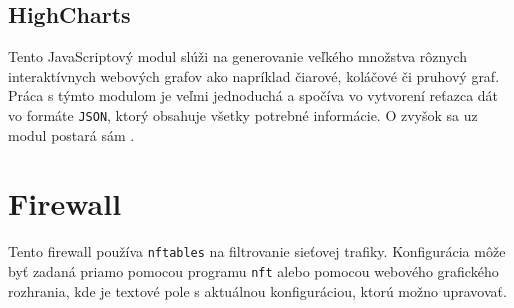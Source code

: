 		\subsection{HighCharts}
		\label{highcharts}
			Tento JavaScriptový modul slúži na generovanie veľkého množstva rôznych interaktívnych webových
			grafov ako napríklad čiarové, koláčové či pruhový graf. Práca s týmto modulom je veľmi jednoduchá
			a spočíva vo vytvorení reťazca dát vo formáte \texttt{JSON}, ktorý obsahuje všetky potrebné 
			informácie. O zvyšok sa uz modul postará sám \cite{highcharts}.
		        
	\section{Firewall}
		Tento firewall používa \texttt{nftables} na filtrovanie sieťovej trafiky. Konfigurácia môže byť 
		zadaná priamo pomocou programu \texttt{nft} alebo pomocou webového grafického rozhrania, kde je
		textové pole s aktuálnou konfiguráciou, ktorú možno upravovať. 